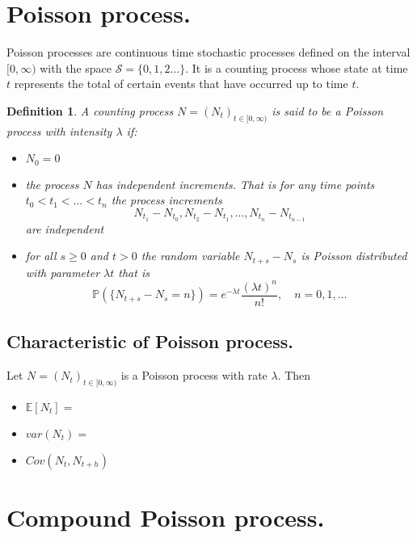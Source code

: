 \documentclass{book}
\newtheorem{definition}{Definition}[section]
\begin{document}
\section{Poisson process.}
Poisson processes are continuous time stochastic processes defined on the interval $[0,\infty)$ with the space $\mathcal{S}=\{0,1,2\dots\}$. It is a counting process whose state at time $t$ represents the total of certain events that have occurred up to time $t$.
\begin{definition}
A counting process $N=(N_{t})_{t\in[0,\infty)}$ is said to be a Poisson process with intensity $\lambda$ if:
\begin{itemize}
\item $N_{0}=0$
\item the process $N$ has independent increments. That is for any time points $t_{0}<t_{1}<\dots<t_{n}$ the process increments
$$
N_{t_{1}}-N_{t_{0}},N_{t_{2}}-N_{t_{1}},\dots,N_{t_{n}}-N_{t_{n-1}}
$$
are independent
\item for all $s\geq 0$ and $t>0$ the random variable $N_{t+s}-N_{s}$ is Poisson distributed with parameter $\lambda t$ that is
$$
\mathbb{P}(\{N_{t+s}-N_{s}=n\})=e^{-\lambda t}\frac{(\lambda t)^{n}}{n!}, \quad n=0,1,\dots
$$
\end{itemize}
\end{definition}

\subsection{Characteristic of Poisson process.}
Let $N=(N_{t})_{t\in[0,\infty)}$ is a Poisson process with rate $\lambda$. Then 
\begin{itemize}
\item $\mathbb{E}[N_{t}]=$
\item $var(N_{t})=$
\item $Cov(N_{t},N_{t+h})$
\end{itemize}
\section{Compound Poisson process.}
\end{document}

